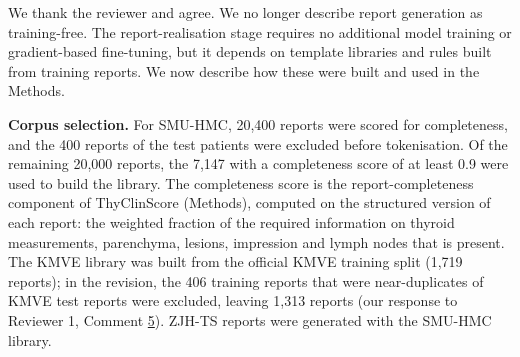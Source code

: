 We thank the reviewer and agree. We no longer describe report generation as training-free. The report-realisation stage requires no additional model training or gradient-based fine-tuning, but it depends on template libraries and rules built from training reports. We now describe how these were built and used in the Methods.\par

\textbf{Corpus selection.} For SMU-HMC, 20,400 reports were scored for completeness, and the 400 reports of the test patients were excluded before tokenisation. Of the remaining 20,000 reports, the 7,147 with a completeness score of at least 0.9 were used to build the library. The completeness score is the report-completeness component of ThyClinScore (Methods), computed on the structured version of each report: the weighted fraction of the required information on thyroid measurements, parenchyma, lesions, impression and lymph nodes that is present. The KMVE library was built from the official KMVE training split (1,719 reports); in the revision, the 406 training reports that were near-duplicates of KMVE test reports were excluded, leaving 1,313 reports (our response to Reviewer 1, Comment \hyperref[rev:R1.5]{5}). ZJH-TS reports were generated with the SMU-HMC library.\par

